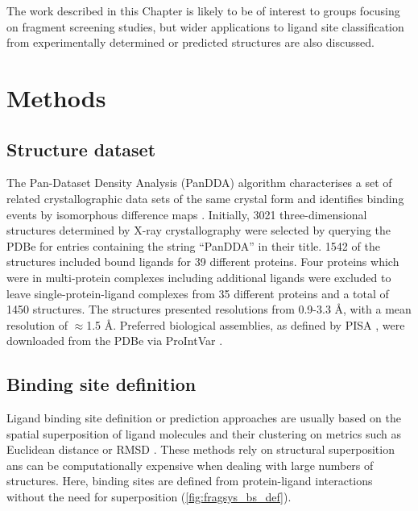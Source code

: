The work described in this Chapter is likely to be of interest to groups focusing on fragment screening studies, but wider applications to ligand site classification from experimentally determined or predicted structures are also discussed. 

\section{Methods}

\label{sec:ch_FRAGSYS_methods}

\subsection{Structure dataset}

The Pan-Dataset Density Analysis (PanDDA) algorithm characterises a set of related crystallographic data sets of the same crystal form and identifies binding events by isomorphous difference maps \cite{PEARCE_2017_PANDDA}. Initially, 3021 three-dimensional structures determined by X-ray crystallography were selected by querying the PDBe \cite{wwPDB_2019_PDB} for entries containing the string ``PanDDA'' in their title. 1542 of the structures included bound ligands for 39 different proteins. Four proteins which were in multi-protein complexes including additional ligands were excluded to leave single-protein-ligand complexes from 35 different proteins and a total of 1450 structures. The structures presented resolutions from 0.9-3.3 \AA{}, with a mean resolution of $\approx$1.5 \AA{}. Preferred biological assemblies, as defined by PISA \cite{KRISSINEL_2007_PISA}, were downloaded from the PDBe via ProIntVar \cite{MACGOWAN_2020_DRSASP}. 

\subsection{Binding site definition}

Ligand binding site definition or prediction approaches are usually based on the spatial superposition of ligand molecules and their clustering on metrics such as Euclidean distance or RMSD \cite{SHIN_2005_PDBLIGAND, KOZAKOV_2005_CLUSTERING, WASS_2010_3DLIGANDSITE, MCGREIG_2022_3DLIGANDSITE}. These methods rely on structural superposition ans can be computationally expensive when dealing with large numbers of structures. Here, binding sites are defined from protein-ligand interactions without the need for superposition (\autoref{fig:fragsys_bs_def}).

